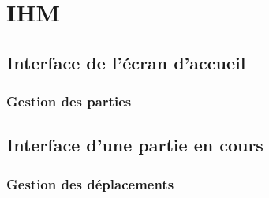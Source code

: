 \chapter{IHM}


\section{Interface de l'écran d'accueil}

\subsection{Gestion des parties}



\section{Interface d'une partie en cours}

\subsection{Gestion des déplacements}

